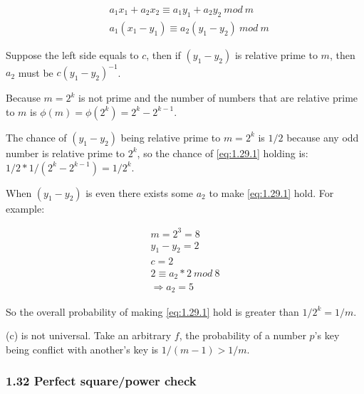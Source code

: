 \documentclass[11pt]{article}
\begin{document}
\begin{align}
  & a_1x_1+a_2x_2 \equiv a_1y_1+a_2y_2 \ mod\ m \\
  & a_1(x_1-y_1) \equiv a_2(y_1-y_2) \ mod\ m \label{eq:1.29.1}
\end{align}

Suppose the left side equals to $c$, then if $(y_1-y_2)$ is relative
prime to $m$, then $a_2$ must be $c(y_1-y_2)^{-1}$.

Because $m=2^k$ is not prime and the number of numbers that are
relative prime to $m$ is $\phi(m) = \phi(2^k) = 2^k - 2^{k-1}$.

The chance of $(y_1-y_2)$ being relative prime to $m=2^k$ is $1/2$
because any odd number is relative prime to $2^k$, so the chance of
\eqref{eq:1.29.1} holding is: $1/2 * 1/(2^k-2^{k-1}) = 1/2^k$.

When $(y_1-y_2)$ is even there exists some $a_2$ to make
\eqref{eq:1.29.1} hold. For example:

\begin{align}
  m=2^3=8 \\
  y_1-y_2=2 \\
  c=2 \\
  2 \equiv a_2*2 \ mod\ 8 \\
  \Rightarrow a_2=5
\end{align}

So the overall probability of making \eqref{eq:1.29.1} hold is greater
than $1/2^k = 1/m$.

(c) is not universal. Take an arbitrary $f$, the probability of a number
$p$'s key being conflict with another's key is $1/(m-1) > 1/m$.

\subsubsection{1.32 Perfect square/power check}
\end{document}

